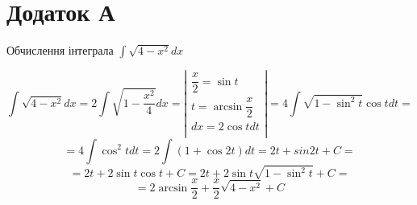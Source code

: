 \documentclass[14pt, a4paper, ukrainian]{extreport}
\begin{document}
	\chapter*{Додаток А}
	\centering Обчислення інтеграла $\int\sqrt{4-x^2}dx$
	
	$$ \int\sqrt{4-x^2}dx = 2\int\sqrt{1-\dfrac{x^2}{4}}dx  = \left|
	\begin{matrix}
		\dfrac{x}{2} = \sin{t}\\
		t = \arcsin\dfrac{x}{2}\\
		dx = 2\cos{t}dt\\
	\end{matrix}
	\right| = 4\int\sqrt{1-{\sin^2{t}}}\cos{t}dt = 
	$$
	$$ = 4\int\cos^2{t}dt = 2\int(1+\cos{2t})dt = 2t + sin2t + C =
	$$
	$$
	= 2t + 2\sin{t}\cos{t} + C = 2t + 2\sin{t}\sqrt{1-\sin^2{t}} + C = 
	$$
	$$
	= 2\arcsin{\dfrac{x}{2}} + \dfrac{x}{2}\sqrt{4-x^2} + C
	$$
		
\end{document}
